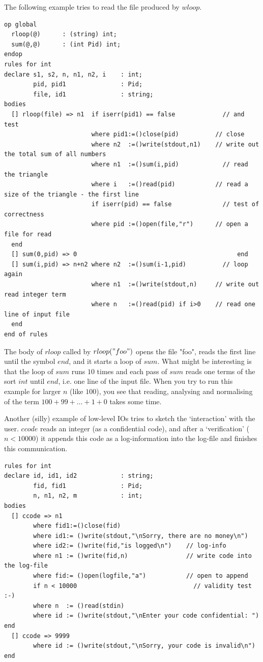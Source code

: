 \documentclass{article}
\begin{document}
{\bigskip

The following example tries to read the file produced by $wloop$.
{\scriptsize
\begin{verbatim}
op global
  rloop(@)      : (string) int;
  sum(@,@)      : (int Pid) int;
endop
rules for int
declare s1, s2, n, n1, n2, i    : int;
        pid, pid1               : Pid;
        file, id1               : string;
bodies
  [] rloop(file) => n1  if iserr(pid1) == false             // and test
                        where pid1:=()close(pid)          // close
                        where n2  :=()write(stdout,n1)    // write out the total sum of all numbers
                        where n1  :=()sum(i,pid)            // read the triangle
                        where i   :=()read(pid)           // read a size of the triangle - the first line
                        if iserr(pid) == false              // test of correctness
                        where pid :=()open(file,"r")      // open a file for read
  end
  [] sum(0,pid) => 0                                            end
  [] sum(i,pid) => n+n2 where n2  :=()sum(i-1,pid)          // loop again
                        where n1  :=()write(stdout,n)     // write out read integer term
                        where n   :=()read(pid) if i>0    // read one line of input file    
  end
end of rules
\end{verbatim}
}
%
The body of $rloop$ called by $rloop("foo")$ opens the file "foo", reads the first line until the
symbol $end$, and it starts a loop of $sum$. What might be interesting is
that the loop of $sum$ runs $10$ times and each pass of $sum$
reads one terms of the sort $int$ until $end$, i.e. one line of
the input file. When you try to run this example for larger $n$ (like
$100$), you see that reading, analysing and normalising of 
the term $100 + 99 + \dots + 1 + 0$ takes some time.

Another (silly) example of low-level IOs tries to sketch the `interaction'
with the user. $ccode$ reads an integer (as a confidential code),
and after a `verification' ($n < 10000$) it appends this code as a log-information
into the log-file and finishes this communication.
%
{\scriptsize
\begin{verbatim}
rules for int
declare id, id1, id2            : string;
        fid, fid1               : Pid;
        n, n1, n2, m            : int;
bodies
  [] ccode => n1
        where fid1:=()close(fid)
        where id1:= ()write(stdout,"\nSorry, there are no money\n") 
        where id2:= ()write(fid,"is logged\n")    // log-info
        where n1 := ()write(fid,n)                // write code into the log-file
        where fid:= ()open(logfile,"a")           // open to append
        if n < 10000                                // validity test :-)
        where n  := ()read(stdin)
        where id := ()write(stdout,"\nEnter your code confidential: ") end
  [] ccode => 9999
        where id := ()write(stdout,"\nSorry, your code is invalid\n")   end
\end{verbatim}
}
}
\end{document}

